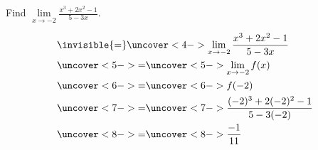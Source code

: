 \begin{frame}
\begin{example} %
Find $\lim\limits_{x\rightarrow -2}\frac{x^3+2x^2-1}{5-3x}$.

\begin{align*}
& \invisible{=} \uncover<4->{\lim_{x\rightarrow -2} \frac{x^3 + 2x^2 - 1}{5-3x}}\\
& \uncover<5->{ = }  
\uncover<5->{\lim_{x\rightarrow -2}f(x)}\\
& \uncover<6->{ = }  
\uncover<6->{f(-2)}\\
& \uncover<7->{ = }  
\uncover<7->{\frac{(-2)^3 + 2(-2)^2 - 1}{5 - 3(-2)}}\\
& \uncover<8->{ = }  
\uncover<8->{\frac{-1}{11}}
\end{align*}
\end{example}
\end{frame}
